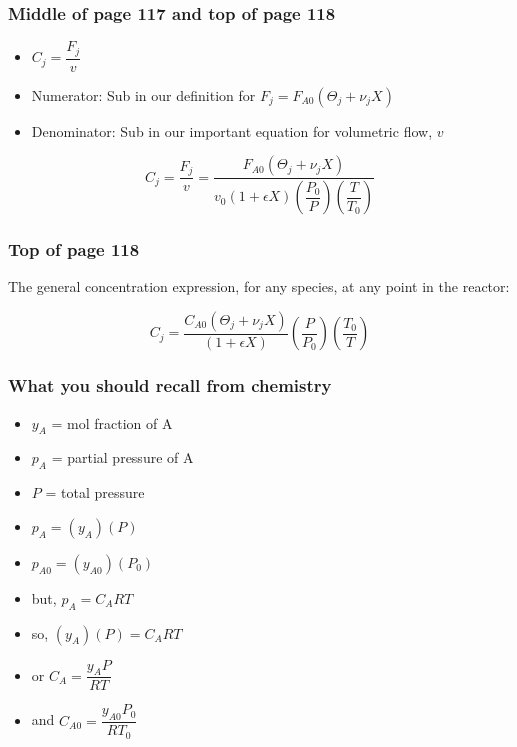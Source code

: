 \begin{frame}\frametitle{Middle of page 117 and top of page 118}
	\begin{itemize}
		\item	$C_j = \dfrac{F_j}{v}$ {\footnotesize\hfill {\color{myOrange}{$\leftarrow$ applies anywhere along the reactor}}}
		\item	{\small {\footnotesize Numerator}: Sub in our definition for $F_j = F_{A0}\left(\Theta_j+\nu_j X\right) $}
		\item	{\small {\footnotesize Denominator}: Sub in our important equation for volumetric flow, $v$}
	\end{itemize}
	\vspace{12pt}
	$$C_j = \dfrac{F_j}{v} = \dfrac{F_{A0}\left(\Theta_j+\nu_j X\right)}{v_0 \left(1 + \epsilon X\right)\left(\dfrac{P_0}{P}\right)\left(\dfrac{T}{T_{0}}\right)}$$
\end{frame}

\begin{frame}\frametitle{Top of page 118}
	The general concentration expression, for any species, at any point in the reactor:
	\vspace{12pt}
	\begin{exampleblock}{}
		$$C_j =\dfrac{C_{A0}\left(\Theta_j+\nu_j X\right)}{\left(1 + \epsilon X\right)}\left(\dfrac{P}{P_0}\right)\left(\dfrac{T_0}{T}\right)$$
	\end{exampleblock}	
\end{frame}

\begin{frame}\frametitle{What you should recall from chemistry}
	\begin{itemize}
		\item	$y_{A}$ = mol fraction of A
		\item	$p_A$ = partial pressure of A
		\item	$P$ = total pressure
		\item	$p_A = (y_A) (P)$ {\footnotesize\hfill {\color{myOrange}{$\leftarrow$ applies anywhere along the reactor}}}
		\item	$p_{A0} = (y_{A0})(P_0)$ {\footnotesize\hfill {\color{myOrange}{$\leftarrow$ applies only at the feed point}}}
		\item	but, $p_A = C_A RT$
		\item	so, $(y_A) (P) = C_A RT$
		\item	or $C_A = \dfrac{y_A P}{RT}$ {\footnotesize\hfill {\color{myOrange}{$\leftarrow$ applies anywhere along the reactor}}}
		\item	and $C_{A0} = \dfrac{y_{A0} P_0}{RT_0}$ {\footnotesize\hfill {\color{myOrange}{$\leftarrow$ applies only at the feed point}}}
	\end{itemize}
\end{frame}

